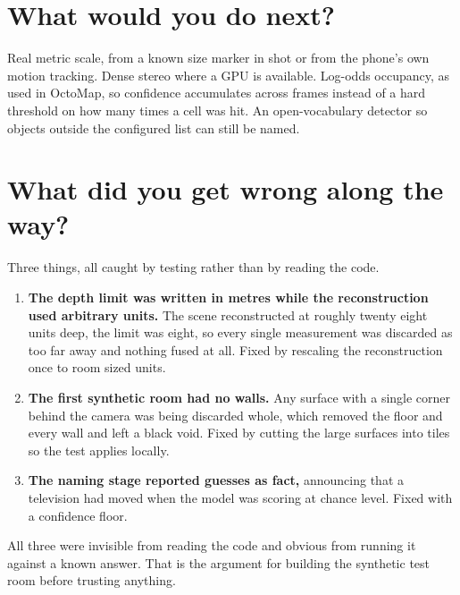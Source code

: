 \section{What would you do next?}

Real metric scale, from a known size marker in shot or from the phone's own motion tracking.
Dense stereo where a GPU is available. Log-odds occupancy, as used in OctoMap, so confidence
accumulates across frames instead of a hard threshold on how many times a cell was hit. An
open-vocabulary detector so objects outside the configured list can still be named.

\section{What did you get wrong along the way?}

Three things, all caught by testing rather than by reading the code.

\begin{enumerate}
  \item \textbf{The depth limit was written in metres while the reconstruction used arbitrary
        units.} The scene reconstructed at roughly twenty eight units deep, the limit was eight, so
        every single measurement was discarded as too far away and nothing fused at all. Fixed by
        rescaling the reconstruction once to room sized units.
  \item \textbf{The first synthetic room had no walls.} Any surface with a single corner behind the
        camera was being discarded whole, which removed the floor and every wall and left a black
        void. Fixed by cutting the large surfaces into tiles so the test applies locally.
  \item \textbf{The naming stage reported guesses as fact,} announcing that a television had moved
        when the model was scoring at chance level. Fixed with a confidence floor.
\end{enumerate}

\begin{plainbox}
All three were invisible from reading the code and obvious from running it against a known answer.
That is the argument for building the synthetic test room before trusting anything.
\end{plainbox}
